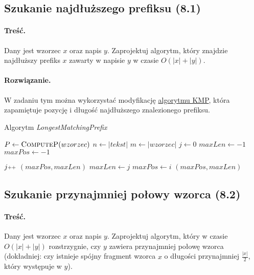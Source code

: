 \subsection{Szukanie najdłuższego prefiksu (8.1)}
\paragraph{Treść.}
Dany jest wzorzec $x$ oraz napis $y$. Zaprojektuj algorytm, który znajdzie najdłuższy prefiks $x$ zawarty w napisie $y$ w czasie $O(|x|+|y|)$.

\paragraph{Rozwiązanie.}
W zadaniu tym można wykorzystać modyfikację \hyperref[KMP]{algorytmu KMP}, która zapamiętuje pozycję i długość najdłuższego znalezionego prefiksu.

\begin{algorithm}[H]
	\caption{Algorytm \emph{LongestMatchingPrefix}}
	\begin{algorithmic}[1]
		\State $P \gets \textsc{ComputeP}(wzorzec)$
		\State $n \gets |tekst|$
		\State $m \gets |wzorzec|$
		\State $j \gets 0$
		\State $maxLen\gets-1$
		\State $maxPos\gets-1$ 
		
				\State $j\pp$
			\EndWhile
				\State\Return $(maxPos, maxLen)$
				\State $maxLen\gets j$
				\State $maxPos\gets i$
			\EndIf
		\EndFor
		\State\Return $(maxPos, maxLen)$
		\EndProcedure		
	\end{algorithmic}
\end{algorithm}

\subsection{Szukanie przynajmniej połowy wzorca (8.2)}

\paragraph{Treść.}
Dany jest wzorzec $x$ oraz napis $y$. Zaprojektuj algorytm, który w czasie $O(|x| + |y|)$ rozstrzygnie, czy $y$ zawiera przynajmniej połowę wzorca (dokładniej: czy istnieje spójny fragment wzorca $x$ o długości przynajmniej $\frac{|x|}{2}$, który występuje w $y$).

